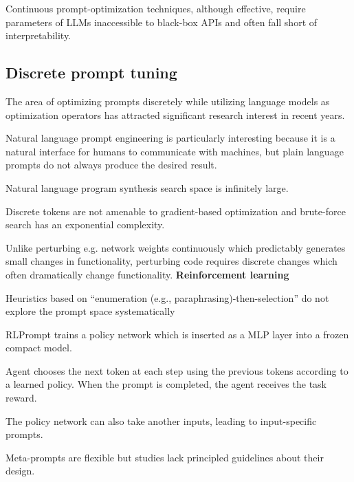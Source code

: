 Continuous prompt-optimization techniques, although effective, require parameters of LLMs inaccessible to black-box APIs and often fall short of interpretability. \cite{guo2024connectinglargelanguagemodels}

\subsection{Discrete prompt tuning}
The area of optimizing prompts discretely while utilizing language models as optimization operators has attracted significant research interest in recent years.

Natural language prompt engineering is particularly interesting because it is a natural interface for humans to communicate with machines, but plain language prompts do not always produce the desired result. \cite{zhou2023largelanguagemodelshumanlevel}

Natural language program synthesis search space is infinitely large. \cite{zhou2023largelanguagemodelshumanlevel}

Discrete tokens are not amenable to gradient-based optimization and brute-force search has an exponential complexity. \cite{deng2022rlpromptoptimizingdiscretetext}

Unlike perturbing e.g. network weights continuously which predictably generates small changes in functionality, perturbing code requires discrete changes which often dramatically change functionality. \cite{lehman2022evolutionlargemodels}
\textbf{Reinforcement learning}

Heuristics based on “enumeration (e.g., paraphrasing)-then-selection” do not explore the prompt space systematically \cite{deng2022rlpromptoptimizingdiscretetext}

RLPrompt trains a policy network which is inserted as a MLP layer into a frozen compact model. \cite{deng2022rlpromptoptimizingdiscretetext}

Agent chooses the next token at each step using the previous tokens according to a learned policy. When the prompt is completed, the agent receives the task reward. \cite{deng2022rlpromptoptimizingdiscretetext}

The policy network can also take another inputs, leading to input-specific prompts. \cite{deng2022rlpromptoptimizingdiscretetext}



Meta-prompts are flexible but studies lack principled guidelines about their design. \cite{tang2024unleashingpotentiallargelanguage}

